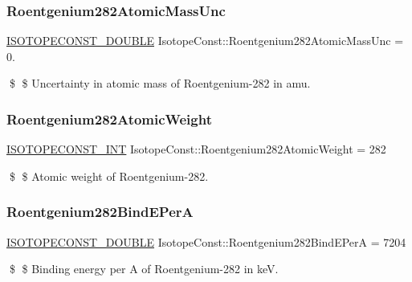 \subsubsection{\texorpdfstring{Roentgenium282\+Atomic\+Mass\+Unc}{Roentgenium282AtomicMassUnc}}
{\footnotesize\ttfamily \mbox{\hyperlink{group___isotope_const-_macros_ga8f45a7272ce02c0b4c65c44636ed719a}{I\+S\+O\+T\+O\+P\+E\+C\+O\+N\+S\+T\+\_\+\+D\+O\+U\+B\+LE}} Isotope\+Const\+::\+Roentgenium282\+Atomic\+Mass\+Unc = 0.}

\$ \$ Uncertainty in atomic mass of Roentgenium-\/282 in amu. \mbox{\label{group___isotope_const-_roentgenium-_rg282_ga9c63029915f2fc4f9c1048fbcac08c9b}} 
\subsubsection{\texorpdfstring{Roentgenium282\+Atomic\+Weight}{Roentgenium282AtomicWeight}}
{\footnotesize\ttfamily \mbox{\hyperlink{group___isotope_const-_macros_ga5f18360b3e99483a35c32d789e62621c}{I\+S\+O\+T\+O\+P\+E\+C\+O\+N\+S\+T\+\_\+\+I\+NT}} Isotope\+Const\+::\+Roentgenium282\+Atomic\+Weight = 282}

\$ \$ Atomic weight of Roentgenium-\/282. \mbox{\label{group___isotope_const-_roentgenium-_rg282_gad52dd72d2adb8f8dfe20b34ef686e364}} 
\subsubsection{\texorpdfstring{Roentgenium282\+Bind\+E\+PerA}{Roentgenium282BindEPerA}}
{\footnotesize\ttfamily \mbox{\hyperlink{group___isotope_const-_macros_ga8f45a7272ce02c0b4c65c44636ed719a}{I\+S\+O\+T\+O\+P\+E\+C\+O\+N\+S\+T\+\_\+\+D\+O\+U\+B\+LE}} Isotope\+Const\+::\+Roentgenium282\+Bind\+E\+PerA = 7204}

\$ \$ Binding energy per A of Roentgenium-\/282 in keV. \mbox{\label{group___isotope_const-_roentgenium-_rg282_gaa4e91e2aeaeff7657f2d6d12e91871a8}} 
